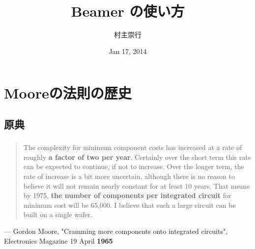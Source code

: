 \documentclass{beamer}  %
\theoremstyle{example}
\begin{document}
\title[Beamer]{Beamer の使い方} 
\author[Nushio]{村主崇行}            %
\date{Jan 17, 2014}

\begin{frame}                  %
\titlepage                     %
\end{frame}

\begin{frame}                  %
\tableofcontents
\end{frame}

\section{Mooreの法則の歴史}          
\subsection{原典}
\begin{frame}\frametitle{\insertsubsection}
\begin{quote}
The complexity for minimum component costs has increased at a rate of roughly {\bf a factor of two per year}. Certainly over the short term this rate can be expected to continue, if not to increase. Over the longer term, the rate of increase is a bit more uncertain, although there is no reason to believe it will not remain nearly constant for at least 10 years. That means by 1975, {\bf the number of components per integrated circuit} for minimum cost will be 65,000. I believe that such a large circuit can be built on a single wafer.
\end{quote}
\begin{flushright}
--- Gordon Moore, "Cramming more components onto integrated circuits", Electronics Magazine 19 April {\bf 1965}
\end{flushright}

\end{frame}
\end{document}
